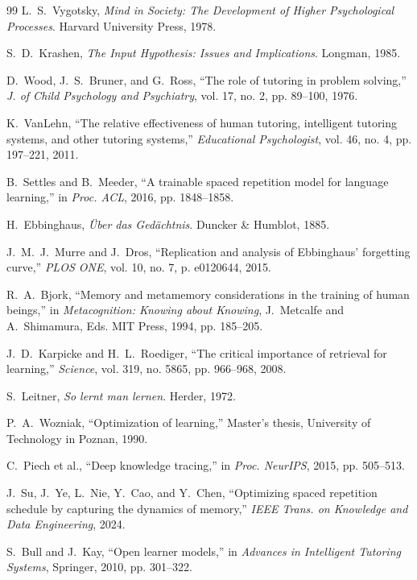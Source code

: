 \documentclass[11pt,a4paper]{article}
\begin{document}
\begin{thebibliography}{99}
L.~S.~Vygotsky, \emph{Mind in Society: The Development of Higher Psychological Processes}. Harvard University Press, 1978.

S.~D.~Krashen, \emph{The Input Hypothesis: Issues and Implications}. Longman, 1985.

D.~Wood, J.~S.~Bruner, and G.~Ross, ``The role of tutoring in problem solving,'' \emph{J. of Child Psychology and Psychiatry}, vol. 17, no. 2, pp. 89--100, 1976.

K.~VanLehn, ``The relative effectiveness of human tutoring, intelligent tutoring systems, and other tutoring systems,'' \emph{Educational Psychologist}, vol. 46, no. 4, pp. 197--221, 2011.

B.~Settles and B.~Meeder, ``A trainable spaced repetition model for language learning,'' in \emph{Proc. ACL}, 2016, pp. 1848--1858.

H.~Ebbinghaus, \emph{\"Uber das Ged\"achtnis}. Duncker \& Humblot, 1885.

J.~M.~J.~Murre and J.~Dros, ``Replication and analysis of Ebbinghaus' forgetting curve,'' \emph{PLOS ONE}, vol. 10, no. 7, p. e0120644, 2015.

R.~A.~Bjork, ``Memory and metamemory considerations in the training of human beings,'' in \emph{Metacognition: Knowing about Knowing}, J.~Metcalfe and A.~Shimamura, Eds. MIT Press, 1994, pp. 185--205.

J.~D.~Karpicke and H.~L.~Roediger, ``The critical importance of retrieval for learning,'' \emph{Science}, vol. 319, no. 5865, pp. 966--968, 2008.

S.~Leitner, \emph{So lernt man lernen}. Herder, 1972.

P.~A.~Wozniak, ``Optimization of learning,'' Master's thesis, University of Technology in Poznan, 1990.

C.~Piech et al., ``Deep knowledge tracing,'' in \emph{Proc. NeurIPS}, 2015, pp. 505--513.

J.~Su, J.~Ye, L.~Nie, Y.~Cao, and Y.~Chen, ``Optimizing spaced repetition schedule by capturing the dynamics of memory,'' \emph{IEEE Trans. on Knowledge and Data Engineering}, 2024.

S.~Bull and J.~Kay, ``Open learner models,'' in \emph{Advances in Intelligent Tutoring Systems}, Springer, 2010, pp. 301--322.


\end{thebibliography}
\end{document}
